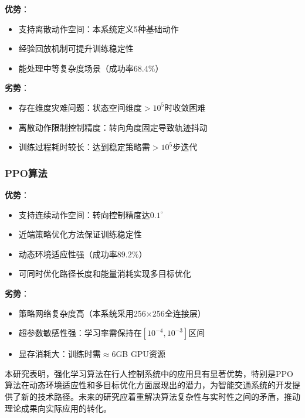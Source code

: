 \textbf{优势}：
\begin{itemize}
  \item 支持离散动作空间：本系统定义5种基础动作
  \item 经验回放机制可提升训练稳定性
  \item 能处理中等复杂度场景（成功率$68.4\%$）
\end{itemize}

\textbf{劣势}：
\begin{itemize}
  \item 存在维度灾难问题：状态空间维度$>10^5$时收敛困难
  \item 离散动作限制控制精度：转向角度固定导致轨迹抖动
  \item 训练过程耗时较长：达到稳定策略需$>10^5$步迭代
\end{itemize}

\subsubsection{PPO算法}
\label{subsubsec:ppo_analysis}

\textbf{优势}：
\begin{itemize}
  \item 支持连续动作空间：转向控制精度达$0.1^\circ$
  \item 近端策略优化方法保证训练稳定性
  \item 动态环境适应性强（成功率$89.2\%$）
  \item 可同时优化路径长度和能量消耗实现多目标优化
\end{itemize}

\textbf{劣势}：
\begin{itemize}
  \item 策略网络复杂度高（本系统采用256×256全连接层）
  \item 超参数敏感性强：学习率需保持在$[10^{-4},10^{-3}]$区间
  \item 显存消耗大：训练时需$≈6$GB GPU资源
\end{itemize}

本研究表明，强化学习算法在行人控制系统中的应用具有显著优势，特别是PPO算法在动态环境适应性和多目标优化方面展现出的潜力，为智能交通系统的开发提供了新的技术路径。未来的研究应着重解决算法复杂性与实时性之间的矛盾，推动理论成果向实际应用的转化。
